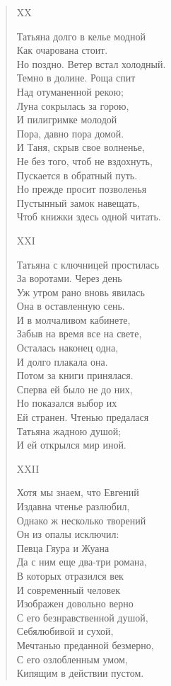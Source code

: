 \begin{verse}
XX

Татьяна долго в келье модной\\
Как очарована стоит.\\
Но поздно. Ветер встал холодный.\\
Темно в долине. Роща спит\\
Над отуманенной рекою;\\
Луна сокрылась за горою,\\
И пилигримке молодой\\
Пора, давно пора домой.\\
И Таня, скрыв свое волненье,\\
Не без того, чтоб не вздохнуть,\\
Пускается в обратный путь.\\
Но прежде просит позволенья\\
Пустынный замок навещать,\\
Чтоб книжки здесь одной читать.

XXI

Татьяна с ключницей простилась\\
За воротами. Через день\\
Уж утром рано вновь явилась\\
Она в оставленную сень.\\
И в молчаливом кабинете,\\
Забыв на время все на свете,\\
Осталась наконец одна,\\
И долго плакала она.\\
Потом за книги принялася.\\
Сперва ей было не до них,\\
Но показался выбор их\\
Ей странен. Чтенью предалася\\
Татьяна жадною душой;\\
И ей открылся мир иной.

XXII

Хотя мы знаем, что Евгений\\
Издавна чтенье разлюбил,\\
Однако ж несколько творений\\
Он из опалы исключил:\\
Певца Гяура и Жуана\\
Да с ним еще два-три романа,\\
В которых отразился век\\
И современный человек\\
Изображен довольно верно\\
С его безнравственной душой,\\
Себялюбивой и сухой,\\
Мечтанью преданной безмерно,\\
С его озлобленным умом,\\
Кипящим в действии пустом.


\end{verse}
